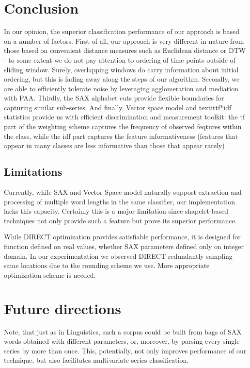 \documentclass{llncs}
\begin{document}
\section{Conclusion}
In our opinion, the superior classification performance of our approach is based on 
a number of factors. 
First of all, our approach is very different in nature from those 
based on convenient distance measures such as Euclidean distance or DTW - to some 
extent we do not pay attention to ordering of time points outside of sliding window. 
Surely, overlapping windows do carry information about initial ordering, but this 
is fading away along the steps of our algorithm.
Secondly, we are able to efficiently tolerate noise by leveraging agglomeration 
and mediation with PAA. 
Thirdly, the SAX alphabet cuts provide flexible boundaries for capturing similar 
sub-series. 
And finally, Vector space model and textit{tf$\ast$idf} statistics provide us 
with efficient discrimination and measurement toolkit: the tf part of the weighting scheme
captures the frequency of observed feqtures within the class, while the idf part 
captures the feature informativeness (features that appear in many classes 
are less informative than those that appear rarely)

\subsection{Limitations}
Currently, while SAX and Vector Space model naturally support extraction and processing of multiple
word lengths in the same classifier, our implementation lacks this capacity. Certainly this is a
major limitation since shapelet-based techniques \cite{bagnal} not only provide such a feature
but prove its superior performance.

While DIRECT optimization provides satisfiable performance, it is designed for function
defined on real values, whether SAX parameters defined only on integer domain. In our
experimentation we observed DIRECT redundantly sampling same locations due to the rounding scheme
we use. More appropriate optimization scheme is needed.


\section{Future directions}
Note, that just as in Linguistics, such a corpus could be built from bags of SAX words obtained with
different parameters, or, moreover, by parsing every single series by more than once. This,
potentially, not only improves performance of our technique, but also facilitates multivariate
series classification.
\end{document}
